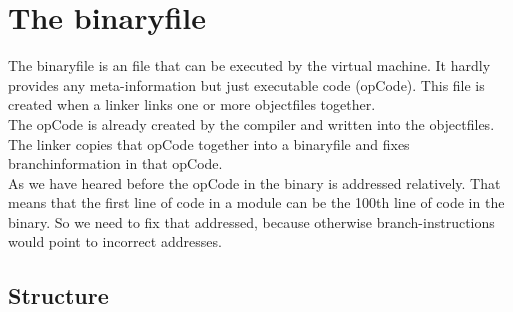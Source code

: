\section{The binaryfile}
The binaryfile is an file that can be executed by the virtual machine. It hardly
provides any meta-information but just executable code (opCode). This file is
created when a linker links one or more objectfiles together. \\
The opCode is already created by the compiler and written into the objectfiles.
The linker copies that opCode together into a binaryfile and fixes
branchinformation in that opCode. \\
As we have heared before the opCode in the binary is addressed relatively. That
means that the first line of code in a module can be the 100th line of code in
the binary. So we need to fix that addressed, because otherwise
branch-instructions would point to incorrect addresses. 
 


\subsection{Structure}

